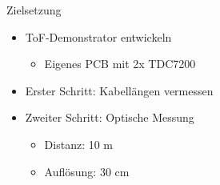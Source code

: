 \begin{frame}{Zielsetzung}
    \begin{itemize}
        \item ToF-Demonstrator entwickeln
        \begin{itemize}
            \item Eigenes PCB mit 2x TDC7200
        \end{itemize}
        \item Erster Schritt: Kabellängen vermessen
        \item Zweiter Schritt: Optische Messung
        \begin{itemize}
            \item Distanz: 10 m
            \item Auflösung: 30 cm
        \end{itemize}
    \end{itemize}
\end{frame}

